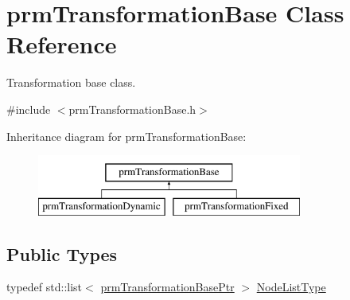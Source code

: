 \hypertarget{classprm_transformation_base}{}\section{prm\+Transformation\+Base Class Reference}
\label{classprm_transformation_base}


Transformation base class.  




{\ttfamily \#include $<$prm\+Transformation\+Base.\+h$>$}

Inheritance diagram for prm\+Transformation\+Base\+:\begin{figure}[H]
\begin{center}
\leavevmode
\includegraphics[height=2.000000cm]{d5/d7b/classprm_transformation_base}
\end{center}
\end{figure}
\subsection*{Public Types}
\begin{DoxyCompactItemize}
\item 
typedef std\+::list$<$ \hyperlink{prm_transformation_base_8h_a881a6a7d2191474974cdf36d79e1df08}{prm\+Transformation\+Base\+Ptr} $>$ \hyperlink{classprm_transformation_base_a577eae3ee032e09a9ebb774081828d5c}{Node\+List\+Type}
\end{DoxyCompactItemize}

